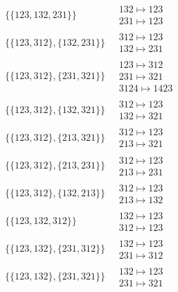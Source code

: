 \begin{scriptsize}
\begin{align}
\{\{123, 132, 231\}\}
\ 
&
\begin{matrix}
132 \mapsto 123
\\
231 \mapsto 123
\end{matrix}
\\
\{\{123, 312\}, \{132, 231\}\}
\ 
&
\begin{matrix}
312 \mapsto 123
\\
132 \mapsto 231
\end{matrix}
\\
\{\{123, 312\}, \{231, 321\}\}
\ 
&
\begin{matrix}
123 \mapsto 312
\\
231 \mapsto 321
\\
3124 \mapsto 1423
\end{matrix}
\\
\{\{123, 312\}, \{132, 321\}\}
\ 
&
\begin{matrix}
312 \mapsto 123
\\
132 \mapsto 321
\end{matrix}
\\
\{\{123, 312\}, \{213, 321\}\}
\ 
&
\begin{matrix}
312 \mapsto 123
\\
213 \mapsto 321
\end{matrix}
\\
\{\{123, 312\}, \{213, 231\}\}
\ 
&
\begin{matrix}
312 \mapsto 123
\\
213 \mapsto 231
\end{matrix}
\\
\{\{123, 312\}, \{132, 213\}\}
\ 
&
\begin{matrix}
312 \mapsto 123
\\
213 \mapsto 132
\end{matrix}
\\
\{\{123, 132, 312\}\}
\ 
&
\begin{matrix}
132 \mapsto 123
\\
312 \mapsto 123
\end{matrix}
\\
\{\{123, 132\}, \{231, 312\}\}
\ 
&
\begin{matrix}
132 \mapsto 123
\\
231 \mapsto 312
\end{matrix}
\\
\{\{123, 132\}, \{231, 321\}\}
\ 
&
\begin{matrix}
132 \mapsto 123
\\
231 \mapsto 321
\end{matrix}

\end{align}
\end{scriptsize}
